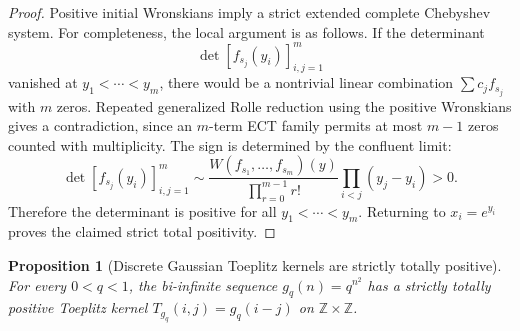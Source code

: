 \documentclass[11pt]{article}
\numberwithin{equation}{section}
\newtheorem{proposition}[theorem]{Proposition}
\theoremstyle{definition}
\theoremstyle{remark}
\newcommand{\1}{\mathbf 1}
\begin{document}
\begin{proof}
Positive initial Wronskians imply a strict extended complete Chebyshev system. For completeness, the local argument is as follows. If the determinant
\[
\det[f_{s_j}(y_i)]_{i,j=1}^m
\]
vanished at \(y_1<\cdots<y_m\), there would be a nontrivial linear combination \(\sum c_j f_{s_j}\) with \(m\) zeros. Repeated generalized Rolle reduction using the positive Wronskians gives a contradiction, since an \(m\)-term ECT family permits at most \(m-1\) zeros counted with multiplicity. The sign is determined by the confluent limit:
\[
\det[f_{s_j}(y_i)]_{i,j=1}^m
\sim
\frac{W(f_{s_1},\ldots,f_{s_m})(y)}{\prod_{r=0}^{m-1}r!}
\prod_{i<j}(y_j-y_i)>0.
\]
Therefore the determinant is positive for all \(y_1<\cdots<y_m\). Returning to \(x_i=e^{y_i}\) proves the claimed strict total positivity.
\end{proof}

\begin{proposition}[Discrete Gaussian Toeplitz kernels are strictly totally positive]
\label{res:discretegaussian-toeplitz-stricttp}
For every \(0<q<1\), the bi-infinite sequence \(g_q(n)=q^{n^2}\) has a strictly totally positive Toeplitz kernel \(T_{g_q}(i,j)=g_q(i-j)\) on \(\mathbb Z\times\mathbb Z\).
\end{proposition}
\end{document}
